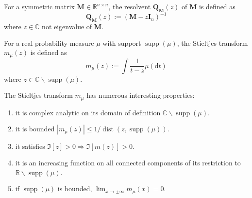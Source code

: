 \begin{definition}[Resolvent]
    For a symmetric matrix $\mathbf{M}\in\mathbb{R}^{n\times n}$, the resolvent $\mathbf{Q}_{\mathbf{M}}(z)$ of $\mathbf{M}$ is defined as
    \begin{equation}
        \mathbf{Q}_{\mathbf{M}}(z):=\left(\mathbf{M}-z\mathbf{I}_{n}\right)^{-1}
    \end{equation}
    where $z\in\mathbb{C}$ not eigenvalue of $\mathbf{M}$.
\end{definition}

\begin{definition}
    For a real probability measure $\mu$ with support $\operatorname{supp}(\mu)$, the Stieltjes transform $m_{\mu}(z)$ is defined as
    \begin{equation}
        m_{\mu}(z):=\int\frac{1}{t-z}\mu\left(\mathrm{d}t\right)
    \end{equation}
    where $z\in\mathbb{C}\backslash\operatorname{supp}(\mu)$.
\end{definition}

\begin{property}
    The Stieltjes transform $m_{\mu}$ has numerous interesting properties:
    \begin{enumerate}
        \item it is complex analytic on its domain of definition $\mathbb{C} \backslash \operatorname{supp}(\mu)$.
        \item it is bounded $\left|m_{\mu}(z)\right|\leq 1/\operatorname{dist}(z,\operatorname{supp}(\mu))$.
        \item it satisfies $\Im[z]>0 \Rightarrow \Im[m(z)]>0$.
        \item it is an increasing function on all connected components of its restriction to $\mathbb{R}\backslash\operatorname{supp}(\mu)$. %
        \item if $\operatorname{supp}(\mu)$ is bounded, $\lim_{x\rightarrow\pm\infty}m_{\mu}(x)=0$.
    \end{enumerate}
\end{property}

